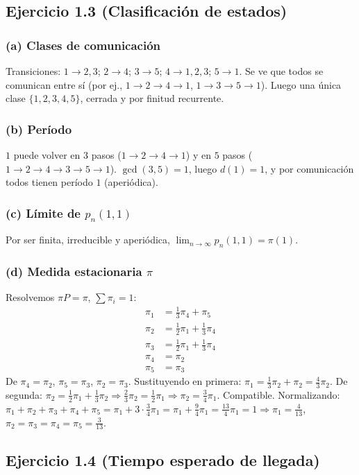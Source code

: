 \documentclass[12pt]{article}
\newcommand{\1}{\mathbf{1}}
\begin{document}
\subsection{Ejercicio 1.3 (Clasificaci\'on de estados)}

\subsubsection*{(a) Clases de comunicaci\'on}
Transiciones: $1\to2,3$; $2\to4$; $3\to5$; $4\to1,2,3$; $5\to1$. Se ve que todos se comunican entre s\'i (por ej., $1\to2\to4\to1$, $1\to3\to5\to1$). Luego una \'unica clase $\{1,2,3,4,5\}$, cerrada y por finitud recurrente.

\subsubsection*{(b) Per\'iodo}
$1$ puede volver en $3$ pasos ($1\to2\to4\to1$) y en $5$ pasos ($1\to2\to4\to3\to5\to1$). $\gcd(3,5)=1$, luego $d(1)=1$, y por comunicaci\'on todos tienen período $1$ (aperi\'odica).

\subsubsection*{(c) L\'imite de $p_n(1,1)$}
Por ser finita, irreducible y aperi\'odica, $\lim_{n\to\infty}p_n(1,1)=\pi(1)$.

\subsubsection*{(d) Medida estacionaria $\pi$}
Resolvemos $\pi P=\pi$, $\sum\pi_i=1$:
\[
\begin{aligned}
\pi_1&=\tfrac13\pi_4+\pi_5\\
\pi_2&=\tfrac12\pi_1+\tfrac13\pi_4\\
\pi_3&=\tfrac12\pi_1+\tfrac13\pi_4\\
\pi_4&=\pi_2\\
\pi_5&=\pi_3
\end{aligned}
\]
De $\pi_4=\pi_2$, $\pi_5=\pi_3$, $\pi_2=\pi_3$. Sustituyendo en primera: $\pi_1=\frac13\pi_2+\pi_2=\frac43\pi_2$. De segunda: $\pi_2=\frac12\pi_1+\frac13\pi_2\Rightarrow \frac23\pi_2=\frac12\pi_1\Rightarrow \pi_2=\frac34\pi_1$. Compatible. Normalizando: $\pi_1+\pi_2+\pi_3+\pi_4+\pi_5=\pi_1+3\cdot\frac34\pi_1=\pi_1+\frac94\pi_1=\frac{13}{4}\pi_1=1\Rightarrow \pi_1=\frac{4}{13}$, $\pi_2=\pi_3=\pi_4=\pi_5=\frac{3}{13}$.

\subsection{Ejercicio 1.4 (Tiempo esperado de llegada)}
\end{document}
